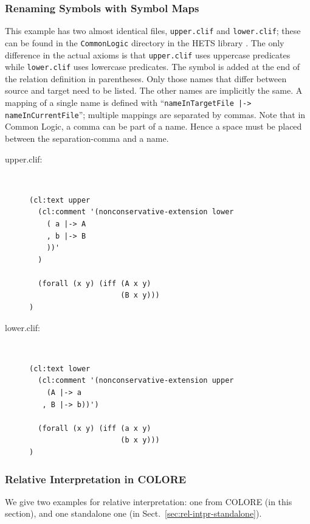 \documentclass{article}
\newcommand{\normalTEXTSC}[2]{{#1\scriptsize#2}}
\newcommand     {\Hets}{\normalTEXTSC{H}{ETS}\xspace}
\begin{document}
\subsubsection{Renaming Symbols with Symbol Maps}
\label{sec:renam-symb-with}

This example has two almost identical files, \texttt{upper.clif} and 
\texttt{lower.clif}; these can be found in the \texttt{CommonLogic} directory in the \Hets library \cite{hets-library:URL}. The only difference in the actual axioms is that 
\texttt{upper.clif} uses uppercase predicates while \texttt{lower.clif} 
uses lowercase predicates. The symbol is added at the end of the relation
definition in parentheses. Only those names that differ between source
and target need to be listed. The other names are implicitly the same. 
A mapping of a single name is defined with 
``\texttt{nameInTargetFile |-> nameInCurrentFile}''; multiple mappings are 
separated by commas. Note that in Common Logic, a comma can be part of a name.
Hence a space must be placed between the separation-comma and a name.\\

\begin{description}
\item[upper.clif:]~\\
\begin{lstlisting}[language=clif]
(cl:text upper
  (cl:comment '(nonconservative-extension lower
    ( a |-> A
    , b |-> B
    ))'
  )
  
  (forall (x y) (iff (A x y)
                     (B x y)))
)
\end{lstlisting}
\item[lower.clif:]~\\
\begin{lstlisting}[language=clif]
(cl:text lower
  (cl:comment '(nonconservative-extension upper
    (A |-> a
   , B |-> b))')
  
  (forall (x y) (iff (a x y)
                     (b x y)))
)
\end{lstlisting}
\end{description}

\subsubsection{Relative Interpretation in COLORE}\label{sec:relat-interpr}

We give two examples for relative interpretation: one from COLORE (in this section), and one standalone one (in Sect.~\ref{sec:rel-intpr-standalone}).
\end{document}
